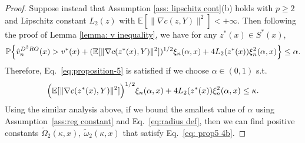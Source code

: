 \documentclass[onefignum,onetabnum]{siamart251216}
\begin{document}
\begin{proof}
    Suppose instead that Assumption \ref{ass: lipschitz cont}(b) holds with $p \geq 2$ and Lipschitz constant $L_2(z)$ with $\mathbb{E} [\| \nabla c(z,Y)\|^2] < +\infty$. Then following the proof of Lemma \ref{lemma: v inequality}, we have for any $z^*(x) \in S^*(x)$, 
    \begin{align*}
        \mathbb{P}\Bigl\{\hat{v}_n^{D^3RO}(x) > v^*(x) + (\mathbb{E}[\|\nabla c(z^*(x),Y)\|^2])^{1/2} \xi_n(\alpha,x) + 4L_2(z^*(x))\xi_n^2(\alpha,x)\Bigr\} \leq \alpha.
    \end{align*}
    Therefore, Eq.~\eqref{eq:proposition-5} is satisfied if we choose $\alpha \in (0,1)$ s.t.
    \begin{align}\label{eq: prop5 4b}
        \Bigl(\mathbb{E}[\|\nabla c(z^*(x),Y)\|^2]\Bigr)^{1/2} \xi_n(\alpha,x)
    + 4L_2(z^*(x))\xi_n^2(\alpha,x) \leq \kappa.
    \end{align}
    Using the similar analysis above, if we bound the smallest value of $\alpha$ using Assumption~\ref{ass:reg constant} and Eq.\ \eqref{eq:radius def}, then we can find positive constants $\tilde{\Omega}_2(\kappa,x),\ \tilde{\omega}_2(\kappa,x)$ that satisfy Eq.~\eqref{eq: prop5 4b}.
\end{proof}
\end{document}
